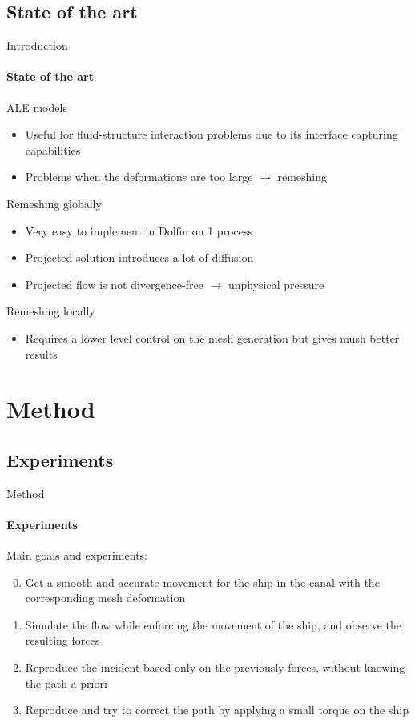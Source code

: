 \documentclass[aspectratio=169]{beamer}
\begin{document}
\subsection{State of the art}
\begin{frame}{Introduction}
    \framesubtitle{State of the art}

    ALE models 
    \begin{itemize}
        \item Useful for fluid-structure interaction problems due to its interface capturing capabilities
        \item Problems when the deformations are too large $\longrightarrow$ remeshing
    \end{itemize}

    \vfill    
    Remeshing globally
    \begin{itemize}
        \item Very easy to implement in Dolfin on 1 process
        \item Projected solution introduces a lot of diffusion
        \item Projected flow is not divergence-free $\longrightarrow$ unphysical pressure
    \end{itemize}

    \vfill
    Remeshing locally
    \begin{itemize}
        \item Requires a lower level control on the mesh generation but gives mush better results \cite{Remacle2010May}
    \end{itemize}
\end{frame}


\section{Method}
\subsection{Experiments}
\begin{frame}{Method}
    \framesubtitle{Experiments}
    Main goals and experiments:

    \begin{enumerate}
        \setcounter{enumi}{-1}
        \item Get a smooth and accurate movement for the ship in the canal with the corresponding mesh deformation
        \item Simulate the flow while enforcing the movement of the ship, and observe the resulting forces
        \item Reproduce the incident based only on the previously forces, without knowing the path a-priori
        \item Reproduce and try to correct the path by applying a small torque on the ship
    \end{enumerate}
\end{frame}
\end{document}
